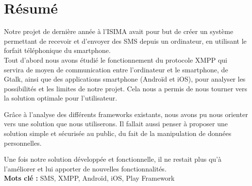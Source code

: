 \cleardoublepage



\chapter*{Résumé}

\thispagestyle{empty}



Notre projet de dernière année à l'ISIMA avait pour but de créer un système permettant de recevoir et d'envoyer des SMS depuis un ordinateur, en utilisant le forfait téléphonique du smartphone.
\\


Tout d'abord nous avons étudié le fonctionnement du protocole XMPP qui servira de moyen de communication entre l'ordinateur et le smartphone, de Gtalk, ainsi que des applications smartphone (Androïd et iOS), pour analyser les possibilités et les limites de notre projet.
Cela nous a permis de nous tourner vers la solution optimale pour l'utilisateur.

Grâce à l'analyse des différents frameworks existants, nous avons pu nous orienter vers une solution que nous utiliserons.
Il fallait aussi penser à proposer une solution simple et sécurisée au public, du fait de la manipulation de données personnelles.

Une fois notre solution développée et fonctionnelle, il ne restait plus qu'à l'améliorer et lui apporter de nouvelles fonctionnalités.
\\



\textbf{Mots clé : }
SMS, XMPP, Androïd, iOS, Play Framework